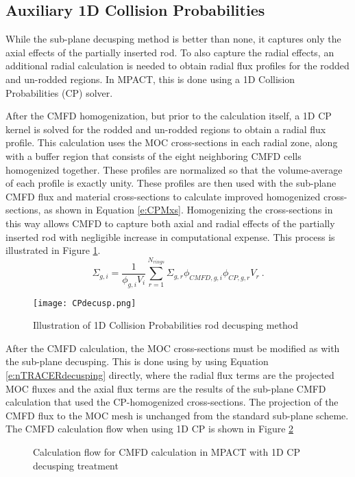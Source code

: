 \subsection{Auxiliary 1D Collision Probabilities}

While the sub-plane decusping method is better than none, it captures only the axial effects of the partially inserted rod.  To also capture the radial effects, an additional radial calculation is needed to obtain radial flux profiles for the rodded and un-rodded regions.  In MPACT, this is done using a 1D Collision Probabilities (CP) solver.

After the CMFD homogenization, but prior to the calculation itself, a 1D CP kernel is solved for the rodded and un-rodded regions to obtain a radial flux profile.  This calculation uses the MOC cross-sections in each radial zone, along with a buffer region that consists of the eight neighboring CMFD cells homogenized together.  These profiles are normalized so that the volume-average of each profile is exactly unity.  These profiles are then used with the sub-plane CMFD flux and material cross-sections to calculate improved homogenized cross-sections, as shown in Equation \ref{e:CPMxs}.  Homogenizing the cross-sections in this way allows CMFD to capture both axial and radial effects of the partially inserted rod with negligible increase in computational expense.  This process is illustrated in Figure \ref{f:CPdecusp}.
\begin{equation}\label{e:CPMxs}
\Sigma_{g,i}=\frac{1}{\phi_{g,i}V_i}\sum_{r=1}^{N_{rings}} \Sigma_{g,r} \phi_{CMFD,g,i} \phi_{CP,g,r} V_r\ .
\end{equation}

\begin{figure}
  \centering
  \texttt{[image: CPdecusp.png]}
  \caption[Collision Probabilities Decusping]{Illustration of 1D Collision Probabilities rod decusping method}\label{f:CPdecusp}
\end{figure}

After the CMFD calculation, the MOC cross-sections must be modified as with the sub-plane decusping.  This is done using by using Equation \ref{e:nTRACERdecusping} directly, where the radial flux terms are the projected MOC fluxes and the axial flux terms are the results of the sub-plane CMFD calculation that used the CP-homogenized cross-sections.  The projection of the CMFD flux to the MOC mesh is unchanged from the standard sub-plane scheme.  The CMFD calculation flow when using 1D CP is shown in Figure \ref{f:1dcpm-flowchart}

\begin{figure}
  \centering
  
  \caption[Stuff]{Calculation flow for CMFD calculation in MPACT with 1D CP decusping treatment}\label{f:1dcpm-flowchart}
\end{figure}